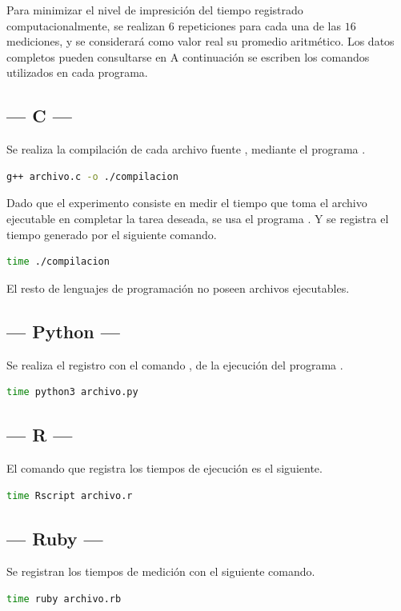 \documentclass[11pt,a4paper]{article}
\begin{document}
Para minimizar el nivel de impresición del tiempo registrado computacionalmente, se realizan \(6\) repeticiones para cada una de las \(16\) mediciones, y se considerará como valor real su promedio aritmético.
Los datos completos pueden consultarse en %
A continuación se escriben los comandos utilizados en cada programa. \\[2mm]
\begin{minipage}{0.5\linewidth}
	\subsection{--- C ---} %
	\label{sub:lenguaje_c}
	Se realiza la compilación de cada archivo fuente , mediante el programa .
	\begin{lstlisting}[language = bash]
g++ archivo.c -o ./compilacion
	\end{lstlisting}
	Dado que el experimento consiste en medir el tiempo que toma el archivo ejecutable  en completar la tarea deseada, se usa el programa . Y se registra el tiempo generado por el siguiente comando.
	\begin{lstlisting}[language = bash]
time ./compilacion
	\end{lstlisting}
	El resto de lenguajes de programación no poseen archivos ejecutables.
\end{minipage}\hspace{5mm}
\begin{minipage}{0.5\linewidth}

	\subsection{--- Python ---} %
	\label{sub:lenguaje_python}
	Se realiza el registro con el comando , de la ejecución del programa .
	\begin{lstlisting}[language = bash]
time python3 archivo.py
	\end{lstlisting}

	\subsection{--- R ---} %
	\label{sub:lenguaje_r}
	El comando que registra los tiempos de ejecución es el siguiente.
	\begin{lstlisting}[language = bash]
time Rscript archivo.r
	\end{lstlisting}

	\subsection{--- Ruby ---} %
	\label{sub:lenguaje_ruby}
	Se registran los tiempos de medición con el siguiente comando.
	\begin{lstlisting}[language = bash]
time ruby archivo.rb
	\end{lstlisting}

\end{minipage}
\end{document}

